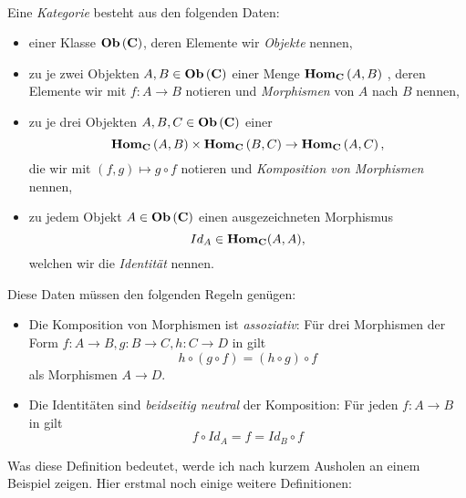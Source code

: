 \documentclass{article}
\renewcommand{\id}{\ensuremath{Id}}
\begin{document}
		\begin{defi}[Kategorie]
		\cite[Definition 2.2.2]{Bra} \\
		Eine \emph{Kategorie} \CatC besteht aus den folgenden Daten:
		\begin{itemize}
			\item einer Klasse \(  \mathbf{Ob}  \left( \mathbf{C} \right) \), deren Elemente wir \emph{Objekte} nennen,
			\item zu je zwei Objekten 
			\(
				A,B \in  \mathbf{Ob}  \left( \mathbf{C}  \right) 
			\)
			einer Menge 
			\(
				 \mathbf{Hom } _\mathbf{C} \left( A,B \right) 
			\)
			, deren Elemente wir mit 
			\(
				f : A \to B 
			\)
			notieren und \emph{Morphismen} von $ A $ nach $ B $ nennen,
			\item zu je drei Objekten 
			\(
		 A,B,C \in  \mathbf{Ob}  \left( \mathbf{C}  \right) 
			\)	
			einer \Abb 
			\begin{displaymath}
				 \mathbf{Hom } _\mathbf{C} \left( A,B \right) \times  \mathbf{Hom } _\mathbf{C} \left( B,C \right) \to  \mathbf{Hom } _\mathbf{C} \left( A,C \right) ,
			\end{displaymath}
			die wir mit 
			\(
				\left( f,g \right) \mapsto g \circ f
			\)
			notieren und \emph{Komposition von Morphismen} nennen, 
		\item zu jedem Objekt 
			\(
				A \in  \mathbf{Ob}  \left( \mathbf{C} \right)
			\) 	
			einen ausgezeichneten Morphismus 
			\begin{displaymath}
				\id_A \in \Hom_\CatC ( A,A) ,
			\end{displaymath}
			welchen wir die \emph{Identit\"at} nennen.
		\end{itemize}
		\newpage
		Diese Daten m\"ussen den folgenden Regeln gen\"ugen:
		\begin{itemize}
			\item Die Komposition von Morphismen ist \emph{assoziativ}: F\"ur drei Morphismen der Form
			\(
				f: A \to B , g: B \to C, h:C \to D 
			\)
			in \CatC gilt 
			\begin{displaymath}
				h \circ \left( g \circ f \right) = \left( h \circ g \right) \circ f
			\end{displaymath}
			als Morphismen
			\(
				A \to D.
			\)
			\item Die Identit\"aten sind \emph{beidseitig neutral} \bzgl der Komposition: F\"ur jeden \Mor 
			\(
				f: A \to B
			\)
			in \CatC gilt
			\begin{displaymath}
				f \circ \id_A = f = \id_B \circ f
			\end{displaymath}
		\end{itemize}
		\end{defi}
		Was  diese Definition bedeutet, werde ich nach kurzem Ausholen an einem Beispiel zeigen.
		Hier erstmal noch einige weitere Definitionen:
		
\end{document}
